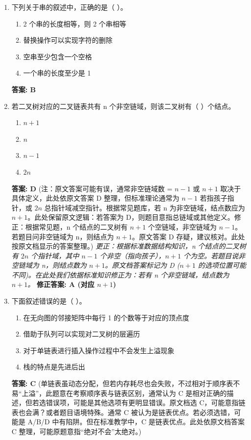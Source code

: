 \documentclass[12pt, a4paper]{article}
\begin{document}
\begin{enumerate}
    \item 下列关于串的叙述中，正确的是（ ）。
    \begin{enumerate}
        \item[A.] 2 个串的长度相等，则 2 个串相等
        \item[B.] 替换操作可以实现字符的删除
        \item[C.] 空串至少包含一个空格
        \item[D.] 一个串的长度至少是 1
    \end{enumerate}
    \textbf{答案: B}

    \item 若二叉树对应的二叉链表共有 n 个非空链域，则该二叉树有（ ）个结点。
    \begin{enumerate}
        \item[A.] $n+1$
        \item[B.] $n$
        \item[C.] $n-1$
        \item[D.] $2n$
    \end{enumerate}
    \textbf{答案: D} (注：原文答案可能有误，通常非空链域数 = $n-1$ 或 $n+1$ 取决于具体定义，此处依原文答案 D 整理，但标准理论通常为 $n-1$ 若指孩子指针，或 $2n$ 总指针域减空指针。根据常见题库，若 n 为非空链域，结点数应为 $n+1$。此处保留原文逻辑：若答案为 D，则题目意指总链域或其他定义。修正：根据常见题，n 个结点的二叉树有 $n+1$ 个空链域，非空链域为 $n-1$。若题目问非空链域为 n，则结点为 $n+1$。原文答案 D 存疑，建议核对。此处按原文档显示的答案整理。)
    \textit{更正：根据标准数据结构知识，n 个结点的二叉树有 $2n$ 个指针域，其中 $n-1$ 个非空（指向孩子），$n+1$ 个为空。若题目说非空链域为 n，则结点数为 $n+1$。原文档答案标记为 D ($n+1$ 的选项位置可能不同)。在此处我们依据标准知识修正为：若有 n 个非空链域，结点数为 $n+1$。}
    \textbf{修正答案: A (对应 $n+1$)}

    \item 下面叙述错误的是（ ）。
    \begin{enumerate}
        \item[A.] 在无向图的邻接矩阵中每行 1 的个数等于对应的顶点度
        \item[B.] 借助于队列可以实现对二叉树的层遍历
        \item[C.] 对于单链表进行插入操作过程中不会发生上溢现象
        \item[D.] 栈的特点是先进后出
    \end{enumerate}
    \textbf{答案: C} (单链表虽动态分配，但若内存耗尽也会失败，不过相对于顺序表不易“上溢”，此题意在考察顺序表与链表区别，通常认为 C 是相对正确的描述，但若选错误项，可能是其他选项有更明显错误。原文档选 C，可能意指链表也会满？或者题目语境特殊。通常 C 被认为是链表优点。若必须选错，可能是 A/B/D 中有陷阱。但在标准教学中，C 是链表优点。此处依原文档答案 C 整理，可能原题意指“绝对不会”太绝对。)


\end{enumerate}
\end{document}
